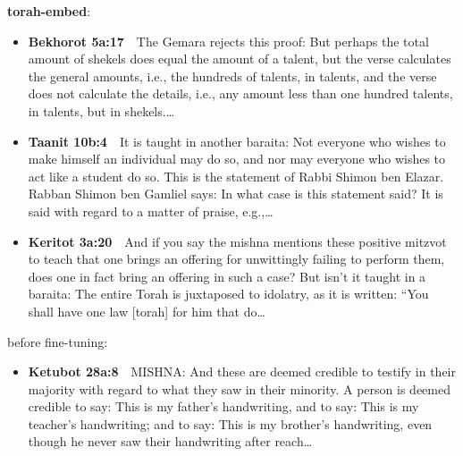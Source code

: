 \documentclass[11pt,a4paper]{article}
\begin{document}
{\color{quiet}\small\textbf{torah-embed}:}
\begin{itemize}[leftmargin=1.2em,itemsep=3pt]
\item {\color{ref}\textbf{Bekhorot 5a:17}}\ \ The Gemara rejects this proof: But perhaps the total amount of shekels does equal the amount of a talent, but the verse calculates the general amounts, i.e., the hundreds of talents, in talents, and the verse does not calculate the details, i.e., any amount less than one hundred talents, in talents, but in shekels.\ldots
\item {\color{ref}\textbf{Taanit 10b:4}}\ \ It is taught in another baraita: Not everyone who wishes to make himself an individual may do so, and nor may everyone who wishes to act like a student do so. This is the statement of Rabbi Shimon ben Elazar. Rabban Shimon ben Gamliel says: In what case is this statement said? It is said with regard to a matter of praise, e.g.,\ldots
\item {\color{ref}\textbf{Keritot 3a:20}}\ \ And if you say the mishna mentions these positive mitzvot to teach that one brings an offering for unwittingly failing to perform them, does one in fact bring an offering in such a case? But isn’t it taught in a baraita: The entire Torah is juxtaposed to idolatry, as it is written: “You shall have one law [torah] for him that do\ldots
\end{itemize}
{\color{quiet}\small before fine-tuning:}
\begin{itemize}[leftmargin=1.2em]
\item {\color{ref}\textbf{Ketubot 28a:8}}\ \ MISHNA: And these are deemed credible to testify in their majority with regard to what they saw in their minority. A person is deemed credible to say: This is my father’s handwriting, and to say: This is my teacher’s handwriting; and to say: This is my brother’s handwriting, even though he never saw their handwriting after reach\ldots
\end{itemize}
\end{document}
